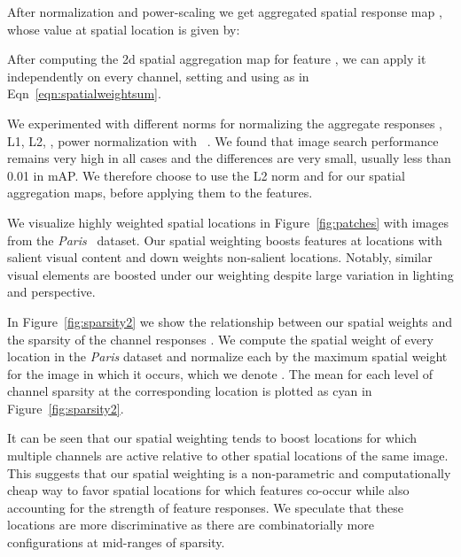 \documentclass[runningheads]{llncs}
\begin{document}
After normalization and power-scaling we get aggregated spatial response map , whose value at spatial location  is given by:




After computing the 2d spatial aggregation map  for feature , we can apply it independently on every channel, setting  and using  as in Eqn~\ref{eqn:spatialweightsum}.









We experimented with different norms for normalizing the aggregate responses , \ie L1, L2, , power normalization with ~\cite{PeSM10}. We found that image search performance remains very high in all cases and the differences are very small, usually less than 0.01 in mAP. We therefore choose to use the L2 norm and  for our spatial aggregation maps, before applying them to the features.

We visualize highly weighted spatial locations in Figure~\ref{fig:patches} with images from the \emph{Paris}~\cite{PCS+08} dataset. Our spatial weighting boosts features at locations with salient visual content and down weights non-salient locations. Notably, similar visual elements are boosted under our weighting despite large variation in lighting and perspective.

In Figure~\ref{fig:sparsity2} we show the relationship between our spatial weights  and the sparsity of the channel responses . We compute the spatial weight  of every location in the \emph{Paris} dataset and normalize each by the maximum spatial weight for the image in which it occurs, which we denote . The mean  for each level of channel sparsity at the corresponding location is plotted as cyan in Figure~\ref{fig:sparsity2}. 







It can be seen that our spatial weighting tends to boost locations for which multiple channels are active relative to other spatial locations of the same image. This suggests that our spatial weighting is a non-parametric and computationally cheap way to favor spatial locations for which features co-occur while also accounting for the strength of feature responses. We speculate that these locations are more discriminative as there are combinatorially more configurations at mid-ranges of sparsity.
\end{document}
